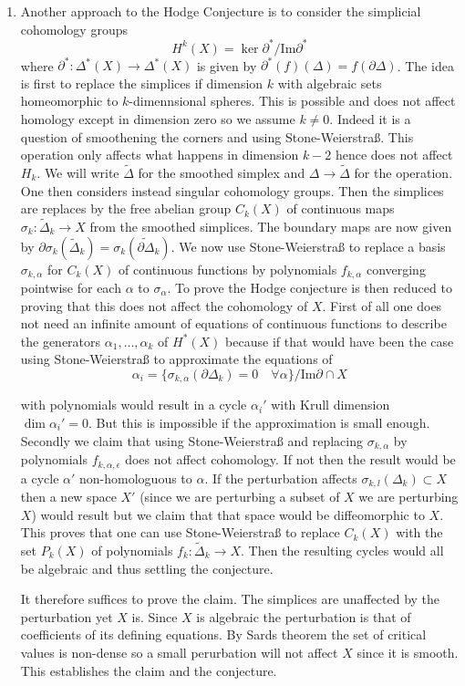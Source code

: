 \documentclass[10pt,a4paper]{amsart}
\begin{document}
\begin{enumerate}
\item Another approach to the Hodge Conjecture is to consider the simplicial cohomology groups
$$H^k(X)=\ker \partial^{\ast}/ \text{Im} \partial^{\ast}$$
where $\partial^{\ast}: \Delta^{\ast}(X)\to \Delta^{\ast}(X)$ is given by $\partial^{\ast}(f)(\Delta)=f(\partial\Delta)$. The idea is first to replace the simplices if dimension $k$ with algebraic sets homeomorphic to $k$-dimennsional spheres. This is possible and does not affect homology except in dimension zero so we assume $k\neq 0$. Indeed it is a question of smoothening the corners and using Stone-Weierstraß. This operation only affects what happens in dimension $k-2$ hence does not affect $H_k$. We will write $\tilde{\Delta}$ for the smoothed simplex and $\Delta\to \tilde{\Delta}$ for the operation.
One then considers instead singular cohomology groups. Then the simplices are replaces by the free abelian group $C_k(X)$ of continuous maps $\sigma_k: \tilde{\Delta}_k\to X$ from the smoothed simplices. The boundary maps are now given by
$\partial \sigma_k (\tilde{\Delta}_k)=\sigma_k(\tilde{\partial\Delta}_k)$. 
We now use Stone-Weierstraß to replace a basis $\sigma_{k, \alpha}$ for $C_k(X)$ of continuous functions by polynomials $f_{k, \alpha}$ converging pointwise for each $\alpha$ to $\sigma_{\alpha}$. To prove the Hodge conjecture is then reduced to proving that this does not affect the cohomology of $X$. First of all one does not need an infinite amount of equations of continuous functions to describe the generators $\alpha_1,\dots, \alpha_k$ of $H^{\ast}(X)$ because if that would have been the case using Stone-Weierstraß to approximate the equations of 
$$\alpha_i=\{\sigma_{k, \alpha}(\partial \Delta_k)=0 \quad \forall \alpha\}/\text{Im} \partial\cap X$$

with polynomials would result in a cycle $\alpha_i'$ with Krull dimension $\dim \alpha_i'=0$. But this is impossible if the approximation is small enough. Secondly we claim that using Stone-Weierstraß and replacing $\sigma_{k, \alpha}$ by polynomials $f_{k, \alpha, \epsilon}$ does not affect cohomology. If not then the result would be a cycle $\alpha'$ non-homologuous to $\alpha$. If the perturbation affects $\sigma_{k, l}(\Delta_k)\subset X$ then a new space $X'$ (since we are perturbing a subset of $X$ we are perturbing $X$) would result but we claim that that space would be diffeomorphic to $X$. This proves that one can use Stone-Weierstraß to replace $C_k(X)$ with the set $P_k(X)$ of polynomials $f_k: \tilde{\Delta}_k\to X$. Then the resulting cycles would all be algebraic and thus settling the conjecture.

It therefore suffices to prove the claim. The simplices are unaffected by the perturbation yet $X$ is. Since $X$ is algebraic the perturbation is that of coefficients of its defining equations. By Sards theorem the set of critical values is non-dense so a small perurbation will not affect $X$ since it is smooth. This establishes the claim and the conjecture. 
\end{enumerate}




\end{document}
